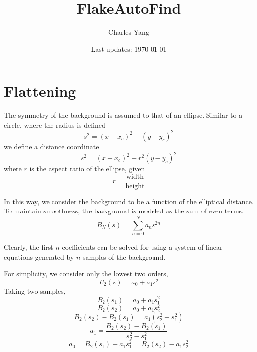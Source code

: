 \documentclass{article}
\title{FlakeAutoFind}
\author{Charles Yang}
\date{Last updates: \today}
\begin{document}
\maketitle

\setcounter{tocdepth}{1}
\tableofcontents

\section{Flattening}
The symmetry of the background is assumed to that of an ellipse. Similar to a circle, where the radius is defined
\[s^2=(x-x_c)^2+(y-y_c)^2\]
we define a distance coordinate
\[s^2=(x-x_c)^2+r^2(y-y_c)^2\]
where \(r\) is the aspect ratio of the ellipse, given
\[r = \frac{\text{width}}{\text{height}}\]

In this way, we consider the background to be a function of the elliptical distance. To maintain smoothness, the background is modeled as the sum of even terms:
\[B_N(s)=\sum_{n=0}^N a_ns^{2n}\]

Clearly, the first \(n\) coefficients can be solved for using a system of linear equations generated by \(n\) samples of the background. 

For simplicity, we consider only the lowest two orders, 
\[B_2(s) = a_0+a_1s^2\]
Taking two samples,
\[B_2(s_1) = a_0+a_1s_1^2\]
\[B_2(s_2) = a_0+a_1s_2^2\]
\[B_2(s_2)-B_2(s_1)=a_1(s_2^2-s_1^2)\]
\[a_1=\frac{B_2(s_2)-B_2(s_1)}{s_2^2-s_1^2}\]
\[a_0=B_2(s_1)-a_1s_1^2=B_2(s_2)-a_1s_2^2\]
\end{document}
